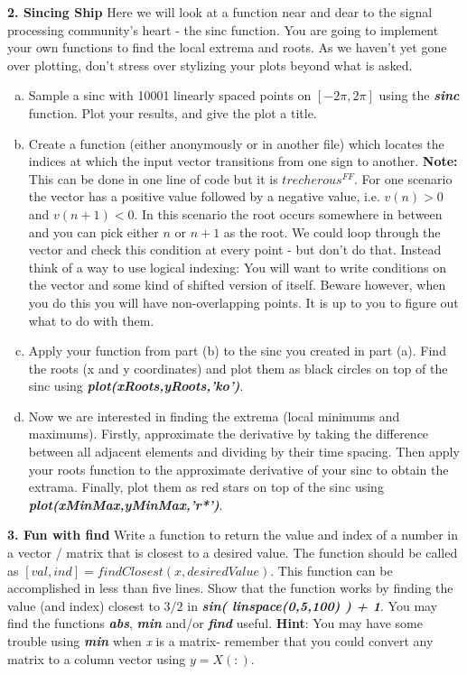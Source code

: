 \documentclass[11pt]{article}
\begin{document}
\noindent
\newline
\textbf{2. Sincing Ship} 
Here we will look at a function near and dear to the signal processing community's heart -
the sinc function.
You are going to implement your own functions to find the local extrema and roots.
As we haven't yet gone over plotting,
don't stress over stylizing your plots beyond what is asked.

\begin{enumerate}[a.]
    \item Sample a sinc with 10001 linearly spaced points on $[-2\pi, 2\pi]$ using 
    the \textbf{\textit{sinc}} function. Plot your results, and give the plot a title.

    \item Create a function (either anonymously or in another file) which locates
    the indices at which the input vector transitions from one sign to another.
    \textbf{Note:} This can be done in one line of code but it is $trecherous^{FF}$.
    For one scenario the vector has a positive value followed by a negative value,
    i.e. $v(n) > 0$ and $v(n+1) < 0$. 
    In this scenario the root occurs somewhere in between and you can pick either $n$ or $n+1$
    as the root.
    We could loop through the vector and check this condition at every point - but don't do that.
    Instead think of a way to use logical indexing:
    You will want to write conditions on the vector and some kind of shifted version of itself.
    Beware however, when you do this you will have non-overlapping points.
    It is up to you to figure out what to do with them.

    \item Apply your function from part (b) to the sinc you created in part (a).
    Find the roots (x and y coordinates) and plot them as black circles
    on top of the sinc using \textbf{\textit{plot(xRoots,yRoots,'ko')}}. 

    \item Now we are interested in finding the extrema
    (local minimums and maximums).
    Firstly, approximate the derivative by taking the difference between all adjacent elements
    and dividing by their time spacing.
    Then apply your roots function to the approximate derivative of your sinc to obtain the extrama.
    Finally, plot them as red stars on top of the sinc using \textbf{\textit{plot(xMinMax,yMinMax,'r*')}}.
\end{enumerate}


\noindent
\newline
\textbf{3. Fun with find}
Write a function to return the value and index of a number in a 
vector / matrix that is closest to a desired value.
The function should be called as $[val, ind] = findClosest(x, desiredValue)$.
This function can be accomplished in less than five lines.
Show that the function works by finding the value (and index) closest to $3/2$
in \textbf{\textit{sin( linspace(0,5,100) ) + 1}}.
You may find the functions \textbf{\textit{abs}}, \textbf{\textit{min}} and/or \textbf{\textit{find}} useful.
\textbf{Hint}: You may have some trouble using \textbf{\textit{min}} when \textit{x} is a matrix-
remember that you could convert any matrix to a column vector using $y = X(:)$.
\end{document}
